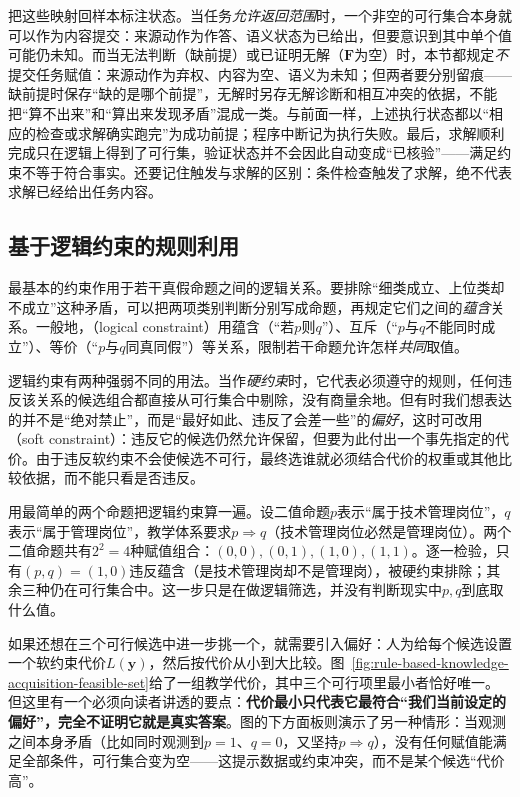 把这些映射回样本标注状态。当任务\emph{允许返回范围}时，一个非空的可行集合本身就可以作为内容提交：来源动作为作答、语义状态为已给出，但要意识到其中单个值可能仍未知。而当无法判断（缺前提）或已证明无解（$\bm{F}$为空）时，本节都规定\emph{不}提交任务赋值：来源动作为弃权、内容为空、语义为未知；但两者要分别留痕——缺前提时保存“缺的是哪个前提”，无解时另存无解诊断和相互冲突的依据，不能把“算不出来”和“算出来发现矛盾”混成一类。与前面一样，上述执行状态都以“相应的检查或求解确实跑完”为成功前提；程序中断记为执行失败。最后，求解顺利完成只在逻辑上得到了可行集，验证状态并不会因此自动变成“已核验”——满足约束不等于符合事实。还要记住触发与求解的区别：条件检查触发了求解，绝不代表求解已经给出任务内容。

\subsection{基于逻辑约束的规则利用}
\label{sec:rule-based-knowledge-acquisition-logical-constraint}

最基本的约束作用于若干真假命题之间的逻辑关系。要排除“细类成立、上位类却不成立”这种矛盾，可以把两项类别判断分别写成命题，再规定它们之间的\emph{蕴含}关系。一般地，（logical constraint）用蕴含（“若$p$则$q$”）、互斥（“$p$与$q$不能同时成立”）、等价（“$p$与$q$同真同假”）等关系，限制若干命题允许怎样\emph{共同}取值。

逻辑约束有两种强弱不同的用法。当作\emph{硬约束}时，它代表必须遵守的规则，任何违反该关系的候选组合都直接从可行集合中剔除，没有商量余地。但有时我们想表达的并不是“绝对禁止”，而是“最好如此、违反了会差一些”的\emph{偏好}，这时可改用（soft constraint）：违反它的候选仍然允许保留，但要为此付出一个事先指定的代价。由于违反软约束不会使候选不可行，最终选谁就必须结合代价的权重或其他比较依据，而不能只看是否违反。

用最简单的两个命题把逻辑约束算一遍。设二值命题$p$表示“属于技术管理岗位”，$q$表示“属于管理岗位”，教学体系要求$p\Rightarrow q$（技术管理岗位必然是管理岗位）。两个二值命题共有$2^2=4$种赋值组合：$(0,0),(0,1),(1,0),(1,1)$。逐一检验，只有$(p,q)=(1,0)$违反蕴含（是技术管理岗却不是管理岗），被硬约束排除；其余三种仍在可行集合中。这一步只是在做逻辑筛选，并没有判断现实中$p,q$到底取什么值。

如果还想在三个可行候选中进一步挑一个，就需要引入偏好：人为给每个候选设置一个软约束代价$L(\bm{y})$，然后按代价从小到大比较。图~\ref{fig:rule-based-knowledge-acquisition-feasible-set}给了一组教学代价，其中三个可行项里最小者恰好唯一。但这里有一个必须向读者讲透的要点：\textbf{代价最小只代表它最符合“我们当前设定的偏好”，完全不证明它就是真实答案}。图的下方面板则演示了另一种情形：当观测之间本身矛盾（比如同时观测到$p=1$、$q=0$，又坚持$p\Rightarrow q$），没有任何赋值能满足全部条件，可行集合变为空——这提示数据或约束冲突，而不是某个候选“代价高”。

